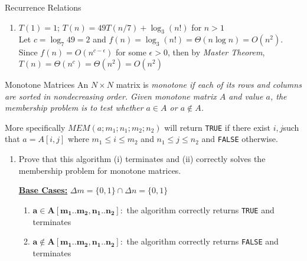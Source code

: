 \documentclass{article}
\begin{document}
\begin{section}{Recurrence Relations}
\begin{enumerate}
    \item $T(1) = 1$; $T(n) = 49T(n/7) + \log_3 (n!)$ for $n > 1$\\
    Let $c = \log_7 49 = 2$ and $f(n) = \log_3 (n!) = \Theta(n \log n) = O(n^2)$. Since $f(n) = O(n^{c - \epsilon})$ for some $\epsilon > 0$, then by {\em Master Theorem}, $\boxed{T(n) = \Theta(n^c) = \Theta (n^2) = O (n^2)}$
\end{enumerate}
\end{section}

\newpage
\begin{section}{Monotone Matrices}
An $N \times N$ matrix is \em{monotone} if each of its rows and columns are sorted in nondecreasing order. Given monotone matrix $A$ and value $a$, the \em{membership problem} is to test whether $a \in A$ or $a \notin A$.

More specifically $MEM(a; m_1; n_1; m_2; n_2)$ will return {\tt TRUE} if there exist $i, j$such that $a = A[i, j]$ where $m_1 \leq i \leq m_2$ and $n_1 \leq j \leq n_2$ and {\tt FALSE} otherwise.

\begin{enumerate}
    \item Prove that this algorithm (i) terminates and (ii) correctly solves the membership problem for monotone matrices.
    
    {\bf \underline{Base Cases:}} $\Delta m = \{0, 1\} \cap \Delta n = \{0, 1\}$
    \begin{enumerate}
        \item {$\mathbf{a \in A[m_1..m_2, n_1..n_2]}:$} the algorithm correctly returns {\tt TRUE} and terminates
        \item {$\mathbf{a \notin A[m_1..m_2, n_1..n_2]}:$} the algorithm correctly returns {\tt FALSE} and terminates 
    \end{enumerate}
    

\end{enumerate}
\end{section}
\end{document}
